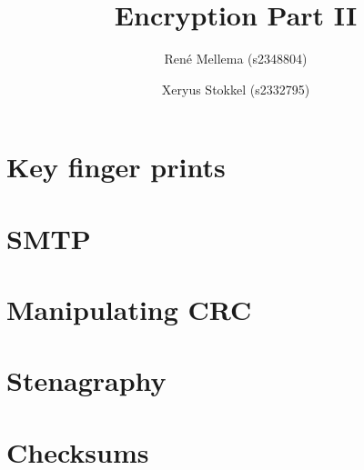 \documentclass[a4paper, 10pt]{article}
\title{Encryption Part II}
\author{Ren\'e Mellema (s2348804) \and Xeryus Stokkel (s2332795)}
\date{} %
\begin{document}
\maketitle

\setcounter{section}{17}

\section{Key finger prints}


\section{SMTP}


\section{Manipulating CRC}


\section{Stenagraphy}


\section{Checksums}

\end{document}
